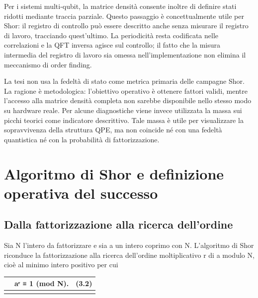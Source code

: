 Per i sistemi multi-qubit, la matrice densità consente inoltre di definire stati ridotti mediante traccia parziale. Questo passaggio è concettualmente utile per Shor: il registro di controllo può essere descritto anche senza misurare il registro di lavoro, tracciando quest'ultimo. La periodicità resta codificata nelle correlazioni e la QFT inversa agisce sul controllo; il fatto che la misura intermedia del registro di lavoro sia omessa nell'implementazione non elimina il meccanismo di order finding.

La tesi non usa la fedeltà di stato come metrica primaria delle campagne Shor. La ragione è metodologica: l'obiettivo operativo è ottenere fattori validi, mentre l'accesso alla matrice densità completa non sarebbe disponibile nello stesso modo su hardware reale. Per alcune diagnostiche viene invece utilizzata la massa sui picchi teorici come indicatore descrittivo. Tale massa è utile per visualizzare la sopravvivenza della struttura QPE, ma non coincide né con una fedeltà quantistica né con la probabilità di fattorizzazione.

\section{Algoritmo di Shor e definizione operativa del successo}\label{sec:finale_3_2}

\subsection{Dalla fattorizzazione alla ricerca dell'ordine}\label{sec:finale_3_2_1}

Sia N l'intero da fattorizzare e sia a un intero coprimo con N. L'algoritmo di Shor riconduce la fattorizzazione alla ricerca dell'ordine moltiplicativo r di a modulo N, cioè al minimo intero positivo per cui

{\def\LTcaptype{none} %
\begin{longtable}[]{@{}
  >{\raggedright\arraybackslash}p{}
  >{\raggedright\arraybackslash}p{}
  >{\raggedright\arraybackslash}p{}@{}}
\toprule\noalign{}
\begin{minipage}[b]{\linewidth}\raggedright
\end{minipage} & \begin{minipage}[b]{\linewidth}\centering
aʳ ≡ 1 (mod N).
\end{minipage} & \begin{minipage}[b]{\linewidth}\raggedleft
(3.2)
\end{minipage} \\
\midrule\noalign{}
\endhead
\bottomrule\noalign{}
\endlastfoot
\end{longtable}
}

